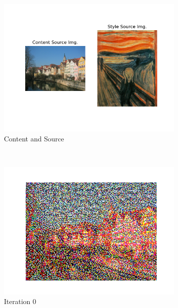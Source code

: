 \documentclass[12pt]{article}
\begin{document}
\begin{figure}[htbp]
    \centering
    \begin{subfigure}[t]{0.48\textwidth}
        \centering
        \includegraphics[trim={3in 1in 3in 1in},scale=0.8]{./Homework2/output/hw2p2_fig05.png}
        \caption{Content and Source}
    \label{hw2p2e}
    \end{subfigure}\\
    \begin{subfigure}[t]{0.48\textwidth}
        \centering
        \includegraphics[trim={3in 0in 3in 0in},scale=0.45]{./Homework2/output/hw2p2_fig06.png}
        \caption{Iteration 0}
    \label{hw2p2f}
    \end{subfigure}
    \begin{subfigure}[t]{0.48\textwidth}

\end{subfigure}
\end{figure}
\end{document}
